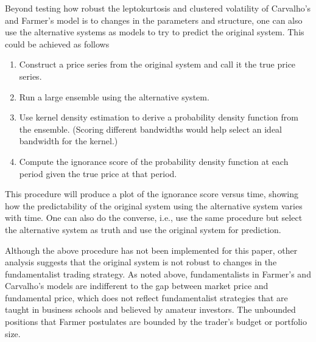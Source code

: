 \documentclass{article}
\begin{document}
Beyond testing how robust the leptokurtosis and clustered volatility of Carvalho's and Farmer's model is to changes in the parameters and structure, one can also use the alternative systems as models to try to predict the original system.
This could be achieved as follows
\begin{enumerate}
\item Construct a price series from the original system and call it the true price series.
\item Run a large ensemble using the alternative system.
\item Use kernel density estimation to derive a probability density function from the ensemble. (Scoring different bandwidths would help select an ideal bandwidth for the kernel.)
\item Compute the ignorance score of the probability density function at each period given the true price at that period.
\end{enumerate}
This procedure will produce a plot of the ignorance score versus time, showing how the predictability of the original system using the alternative system varies with time. One can also do the converse, i.e., use the same procedure but select the alternative system as truth and use the original system for prediction.

Although the above procedure has not been implemented for this paper, other analysis suggests that the original system is not robust to changes in the fundamentalist trading strategy. As noted above, fundamentalists in Farmer's and Carvalho's models are indifferent to the gap between market price and fundamental price, which does not reflect fundamentalist strategies that are taught in business schools and believed by amateur investors. The unbounded positions that Farmer postulates are bounded by the trader's budget or portfolio size.
\end{document}
